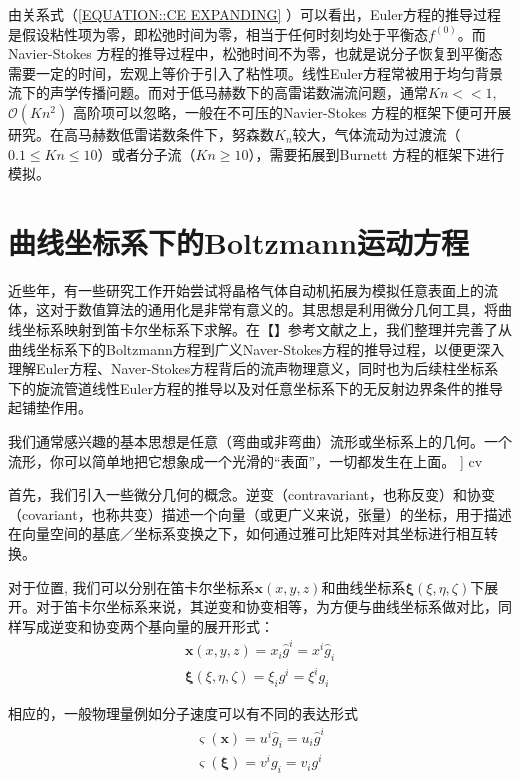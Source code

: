 \documentclass[MathematicsNumericsDerivationsAndOpenFOAM.tex]{subfiles}
\begin{document}
由关系式（\ref{EQUATION::CE EXPANDING} ）可以看出，Euler方程的推导过程是假设粘性项为零，即松弛时间为零，相当于任何时刻均处于平衡态$f^{(0)}$。而 Navier-Stokes 方程的推导过程中，松弛时间不为零，也就是说分子恢复到平衡态需要一定的时间，宏观上等价于引入了粘性项。线性Euler方程常被用于均匀背景流下的声学传播问题。而对于低马赫数下的高雷诺数湍流问题，通常$Kn << 1$, $\mathcal{O}\left(K n^{2}\right)$ 高阶项可以忽略，一般在不可压的Navier-Stokes 方程的框架下便可开展研究。在高马赫数低雷诺数条件下，努森数$K_n$较大，气体流动为过渡流（$0.1\leq Kn\leq 10$）或者分子流（$Kn\geq10$），需要拓展到Burnett 方程的框架下进行模拟。




%
%
%
%
\section{曲线坐标系下的Boltzmann运动方程}
%
%
近些年，有一些研究工作开始尝试将晶格气体自动机拓展为模拟任意表面上的流体，这对于数值算法的通用化是非常有意义的。其思想是利用微分几何工具，将曲线坐标系映射到笛卡尔坐标系下求解。在【】参考文献之上，我们整理并完善了从曲线坐标系下的Boltzmann方程到广义Naver-Stokes方程的推导过程，以便更深入理解Euler方程、Naver-Stokes方程背后的流声物理意义，同时也为后续柱坐标系下的旋流管道线性Euler方程的推导以及对任意坐标系下的无反射边界条件的推导起铺垫作用。
%
%

我们通常感兴趣的基本思想是任意（弯曲或非弯曲）流形或坐标系上的几何。一个流形，你可以简单地把它想象成一个光滑的“表面”，一切都发生在上面。
] cv


首先，我们引入一些微分几何的概念。逆变（contravariant，也称反变）和协变（covariant，也称共变）描述一个向量（或更广义来说，张量）的坐标，用于描述在向量空间的基底／坐标系变换之下，如何通过雅可比矩阵对其坐标进行相互转换。

对于位置, 我们可以分别在笛卡尔坐标系$\boldsymbol{x}(x,y,z)$和曲线坐标系$\boldsymbol{\xi}(\xi,\eta,\zeta)$下展开。对于笛卡尔坐标系来说，其逆变和协变相等，为方便与曲线坐标系做对比，同样写成逆变和协变两个基向量的展开形式：
%
%
\begin{equation}
  \begin{aligned}
    \boldsymbol{x}(x,y,z)=x_{i} \widehat{g}^{i}=x^{i} \widehat{g}_{i} \\
    \boldsymbol{\xi}(\xi,\eta,\zeta)=\xi_{i} g^{i}=\xi^{i} g_{i}
  \end{aligned}
\end{equation}


%
%

相应的，一般物理量例如分子速度可以有不同的表达形式
%
%
\begin{equation}
  \begin{aligned}
    \boldsymbol{\varsigma(\boldsymbol{x})}=u^{i} \widehat{g}_{i}=u_{i} \widehat{g}^{i} \\
    \boldsymbol{\varsigma(\boldsymbol{\xi})}=v^{i}g_{i}=v_{i} g^{i}
  \end{aligned}
\end{equation}
\end{document}
